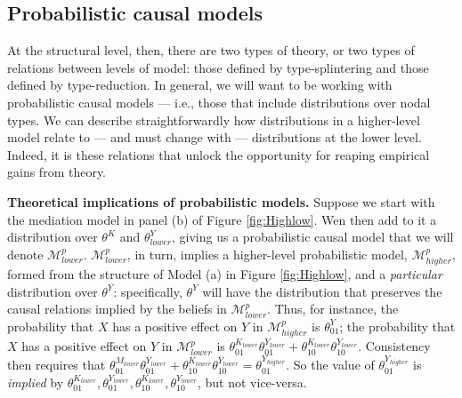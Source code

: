 \documentclass[
  12pt,
]{book}
\begin{document}
\hypertarget{probabilistic-causal-models}{%
\subsection{Probabilistic causal models}\label{probabilistic-causal-models}}

At the structural level, then, there are two types of theory, or two types of relations between levels of model: those defined by type-splintering and those defined by type-reduction. In general, we will want to be working with probabilistic causal models --- i.e., those that include distributions over nodal types. We can describe straightforwardly how distributions in a higher-level model relate to --- and must change with --- distributions at the lower level. Indeed, it is these relations that unlock the opportunity for reaping empirical gains from theory.

\textbf{Theoretical implications of probabilistic models.} Suppose we start with the mediation model in panel (b) of Figure \ref{fig:Highlow}. Wen then add to it a distribution over \(\theta^K\) and \(\theta^Y_{lower}\), giving us a probabilistic causal model that we will denote \(\mathcal M^p_{lower}\). \(\mathcal M^p_{lower}\), in turn, implies a higher-level probabilistic model, \(\mathcal M^p_{higher}\), formed from the structure of Model (a) in Figure \ref{fig:Highlow}, and a \emph{particular} distribution over \(\theta^Y\): specifically, \(\theta^Y\) will have the distribution that preserves the causal relations implied by the beliefs in \(\mathcal M^p_{lower}\). Thus, for instance, the probability that \(X\) has a positive effect on \(Y\) in \(\mathcal M^p_{higher}\) is \(\theta^{Y}_{01}\); the probability that \(X\) has a positive effect on \(Y\) in \(\mathcal M^p_{lower}\) is \(\theta^{K_{lower}}_{01}\theta^{Y_{lower}}_{01} + \theta^{K_{lower}}_{10}\theta^{Y_{lower}}_{10}\). Consistency then requires that \(\theta^{M_{lower}}_{01}\theta^{Y_{lower}}_{01} + \theta^{K_{lower}}_{10}\theta^{Y_{lower}}_{10} = \theta^{Y_{higher}}_{01}\). So the value of \(\theta^{Y_{higher}}_{01}\) is \emph{implied} by \(\theta^{K_{lower}}_{01},\theta^{Y_{lower}}_{01}, \theta^{K_{lower}}_{10},\theta^{Y_{lower}}_{10}\), but not vice-versa.
\end{document}
